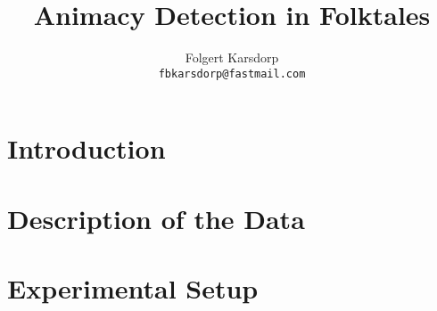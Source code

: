 \documentclass[a4paper, twocolumn, 11pt]{article}
\author{Folgert Karsdorp\\\texttt{fbkarsdorp@fastmail.com}}
\title{Animacy Detection in Folktales}
\date{}
\begin{document}
\maketitle

\section{Introduction}

\section{Description of the Data}

\section{Experimental Setup}
\end{document}
